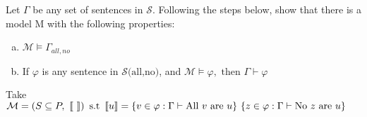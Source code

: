 \newpage
Let $\Gamma $ be any set of sentences in $\mathscr{S}$. Following the steps below, show that there is a
model M with the following properties:
\begin{enumerate}[(a)]
	\item
		$\mathcal{M} \vDash  \Gamma_{all,no}$

	\item
		If $\varphi $ is any sentence in $\mathscr{S}\text{(all,no)}$, and $\mathcal{M} \vDash  \varphi,\text{ then }\Gamma \vdash  \varphi $
\end{enumerate}
Take $\mathcal{M} = \left(  S \subseteq P,\ \left\llbracket  \ \right\rrbracket  \right) \text{ s.t }  \left\llbracket  u  \right\rrbracket = \left\{  v \in  \varphi : \Gamma \vdash  \text{All } v \text{ are } u  \right\}\\\left\{  z \in  \varphi :\Gamma \vdash \text{No }z \text{ are }u \right\}$ 
